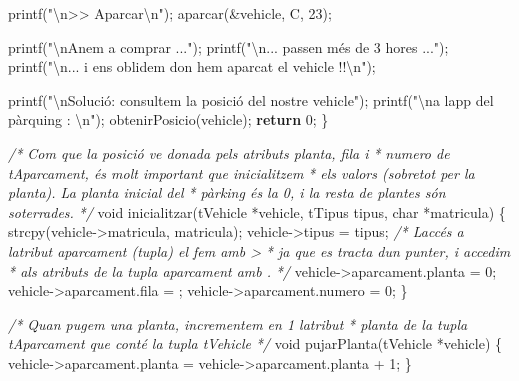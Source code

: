 \documentclass[
]{book}
\newenvironment{Shaded}{\begin{snugshade}}{\end{snugshade}}
\newcommand{\CharTok}[1]{\textcolor[rgb]{0.31,0.60,0.02}{#1}}
\newcommand{\CommentTok}[1]{\textcolor[rgb]{0.56,0.35,0.01}{\textit{#1}}}
\newcommand{\ControlFlowTok}[1]{\textcolor[rgb]{0.13,0.29,0.53}{\textbf{#1}}}
\newcommand{\DataTypeTok}[1]{\textcolor[rgb]{0.13,0.29,0.53}{#1}}
\newcommand{\DecValTok}[1]{\textcolor[rgb]{0.00,0.00,0.81}{#1}}
\newcommand{\NormalTok}[1]{#1}
\newcommand{\SpecialCharTok}[1]{\textcolor[rgb]{0.00,0.00,0.00}{#1}}
\newcommand{\StringTok}[1]{\textcolor[rgb]{0.31,0.60,0.02}{#1}}
\begin{document}
\begin{Shaded}
\begin{Highlighting}[]
\NormalTok{    printf(}\StringTok{"}\SpecialCharTok{\textbackslash{}n}\StringTok{\textgreater{}\textgreater{} Aparcar}\SpecialCharTok{\textbackslash{}n}\StringTok{"}\NormalTok{);}
\NormalTok{    aparcar(\&vehicle, }\CharTok{\textquotesingle{}C\textquotesingle{}}\NormalTok{, }\DecValTok{23}\NormalTok{);}
    
\NormalTok{    printf(}\StringTok{"}\SpecialCharTok{\textbackslash{}n}\StringTok{Anem a comprar ..."}\NormalTok{);}
\NormalTok{    printf(}\StringTok{"}\SpecialCharTok{\textbackslash{}n}\StringTok{... passen més de 3 hores ..."}\NormalTok{);}
\NormalTok{    printf(}\StringTok{"}\SpecialCharTok{\textbackslash{}n}\StringTok{... i ens oblidem d\textquotesingle{}on hem aparcat el vehicle !!}\SpecialCharTok{\textbackslash{}n}\StringTok{"}\NormalTok{);}
    
\NormalTok{    printf(}\StringTok{"}\SpecialCharTok{\textbackslash{}n}\StringTok{Solució: consultem la posició del nostre vehicle"}\NormalTok{);}
\NormalTok{    printf(}\StringTok{"}\SpecialCharTok{\textbackslash{}n}\StringTok{a l\textquotesingle{}app del pàrquing : }\SpecialCharTok{\textbackslash{}n}\StringTok{"}\NormalTok{);}
\NormalTok{    obtenirPosicio(vehicle);}
    \ControlFlowTok{return} \DecValTok{0}\NormalTok{;}
\NormalTok{\}}

\CommentTok{/* Com que la posició ve donada pels atributs planta, fila i}
\CommentTok{ * numero de tAparcament, és molt important que inicialitzem}
\CommentTok{ * els valors (sobretot per la planta). La planta inicial del}
\CommentTok{ * pàrking és la 0, i la resta de plantes són soterrades.}
\CommentTok{ */}
\DataTypeTok{void}\NormalTok{ inicialitzar(tVehicle *vehicle, tTipus tipus, }\DataTypeTok{char}\NormalTok{ *matricula) \{}
\NormalTok{    strcpy(vehicle{-}\textgreater{}matricula, matricula);}
\NormalTok{    vehicle{-}\textgreater{}tipus = tipus;}
    \CommentTok{/* L\textquotesingle{}accés a l\textquotesingle{}atribut aparcament (tupla) el fem amb \textquotesingle{}{-}\textgreater{}\textquotesingle{}}
\CommentTok{     * ja que es tracta d\textquotesingle{}un punter, i accedim}
\CommentTok{     * als atributs de la tupla aparcament amb \textquotesingle{}.\textquotesingle{}}
\CommentTok{     */}
\NormalTok{    vehicle{-}\textgreater{}aparcament.planta = }\DecValTok{0}\NormalTok{;}
\NormalTok{    vehicle{-}\textgreater{}aparcament.fila = }\CharTok{\textquotesingle{}{-}\textquotesingle{}}\NormalTok{;}
\NormalTok{    vehicle{-}\textgreater{}aparcament.numero = }\DecValTok{0}\NormalTok{;}
\NormalTok{\}}

\CommentTok{/* Quan pugem una planta, incrementem en 1 l\textquotesingle{}atribut}
\CommentTok{ * planta de la tupla tAparcament que conté la tupla tVehicle }
\CommentTok{ */}
\DataTypeTok{void}\NormalTok{ pujarPlanta(tVehicle *vehicle) \{}
\NormalTok{    vehicle{-}\textgreater{}aparcament.planta = vehicle{-}\textgreater{}aparcament.planta + }\DecValTok{1}\NormalTok{;}
\NormalTok{\}}


\end{Highlighting}
\end{Shaded}
\end{document}
